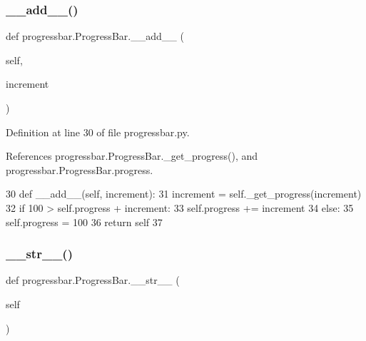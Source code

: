 \subsubsection{\texorpdfstring{\+\_\+\+\_\+add\+\_\+\+\_\+()}{\_\_add\_\_()}}
{\footnotesize\ttfamily def progressbar.\+Progress\+Bar.\+\_\+\+\_\+add\+\_\+\+\_\+ (\begin{DoxyParamCaption}\item[{}]{self,  }\item[{}]{increment }\end{DoxyParamCaption})\hspace{0.3cm}{\ttfamily [inherited]}}



Definition at line 30 of file progressbar.\+py.



References progressbar.\+Progress\+Bar.\+\_\+get\+\_\+progress(), and progressbar.\+Progress\+Bar.\+progress.


\begin{DoxyCode}
30     \textcolor{keyword}{def }\_\_add\_\_(self, increment):
31         increment = self.\_get\_progress(increment)
32         \textcolor{keywordflow}{if} 100 > self.progress + increment:
33             self.progress += increment
34         \textcolor{keywordflow}{else}:
35             self.progress = 100
36         \textcolor{keywordflow}{return} self
37     
\end{DoxyCode}
\mbox{\label{classprogressbar_1_1ProgressBar_aea02b9e37516e9d267e2d48b4e415bd8}} 
\subsubsection{\texorpdfstring{\+\_\+\+\_\+str\+\_\+\+\_\+()}{\_\_str\_\_()}}
{\footnotesize\ttfamily def progressbar.\+Progress\+Bar.\+\_\+\+\_\+str\+\_\+\+\_\+ (\begin{DoxyParamCaption}\item[{}]{self }\end{DoxyParamCaption})\hspace{0.3cm}{\ttfamily [inherited]}}




